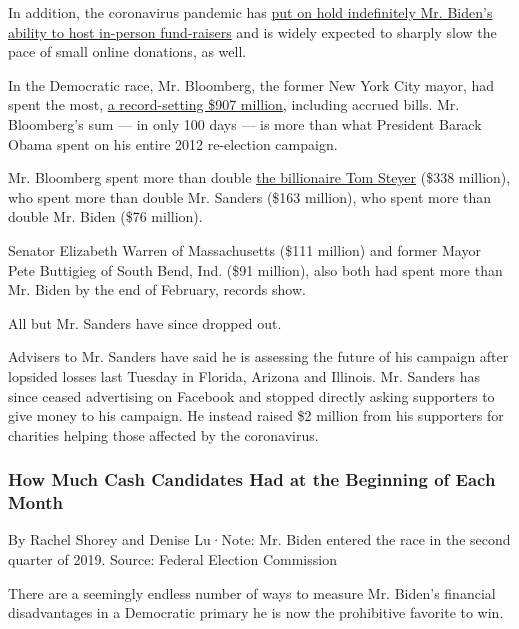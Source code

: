 In addition, the coronavirus pandemic has
\href{https://www.nytimes3xbfgragh.onion/2020/03/12/us/politics/coronavirus-2020-campaign.html}{put
on hold indefinitely Mr. Biden's ability to host in-person fund-raisers}
and is widely expected to sharply slow the pace of small online
donations, as well.

In the Democratic race, Mr. Bloomberg, the former New York City mayor,
had spent the most,
\href{https://www.nytimes3xbfgragh.onion/2020/03/20/us/politics/bloomberg-campaign-900-million.html}{a
record-setting \$907 million}, including accrued bills. Mr. Bloomberg's
sum --- in only 100 days --- is more than what President Barack Obama
spent on his entire 2012 re-election campaign.

Mr. Bloomberg spent more than double
\href{https://www.nytimes3xbfgragh.onion/2019/08/27/us/politics/tom-steyer-debate.html}{the
billionaire Tom Steyer} (\$338 million), who spent more than double Mr.
Sanders (\$163 million), who spent more than double Mr. Biden (\$76
million).

Senator Elizabeth Warren of Massachusetts (\$111 million) and former
Mayor Pete Buttigieg of South Bend, Ind. (\$91 million), also both had
spent more than Mr. Biden by the end of February, records show.

All but Mr. Sanders have since dropped out.

Advisers to Mr. Sanders have said he is assessing the future of his
campaign after lopsided losses last Tuesday in Florida, Arizona and
Illinois. Mr. Sanders has since ceased advertising on Facebook and
stopped directly asking supporters to give money to his campaign. He
instead raised \$2 million from his supporters for charities helping
those affected by the coronavirus.

\hypertarget{how-much-cash-candidates-had-at-the-beginning-of-each-month}{%
\subsubsection{How Much Cash Candidates Had at the Beginning of Each
Month}\label{how-much-cash-candidates-had-at-the-beginning-of-each-month}}

By Rachel Shorey and Denise Lu·Note: Mr. Biden entered the race in the
second quarter of 2019. \textbar{} Source: Federal Election Commission

There are a seemingly endless number of ways to measure Mr. Biden's
financial disadvantages in a Democratic primary he is now the
prohibitive favorite to win.

